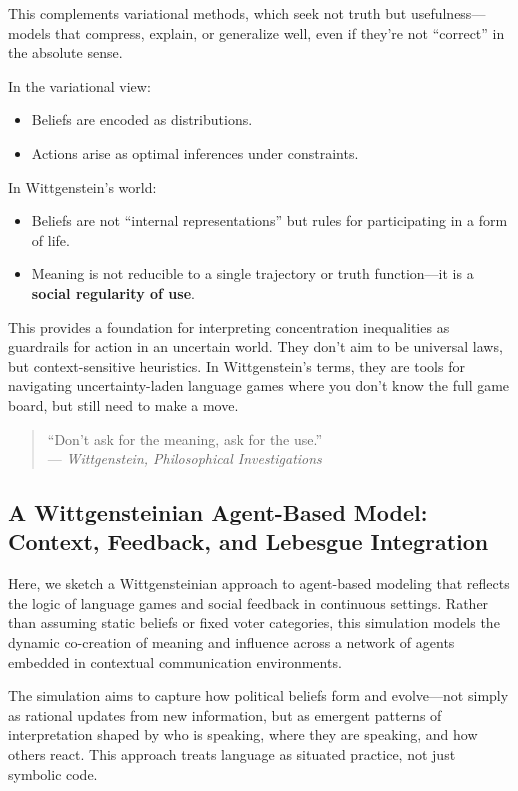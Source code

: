 This complements variational methods, which seek not truth but usefulness—models that compress, explain, or generalize well, even if they're not ``correct'' in the absolute sense.

In the variational view:
\begin{itemize}
    \item Beliefs are encoded as distributions.
    \item Actions arise as optimal inferences under constraints.
\end{itemize}

In Wittgenstein’s world:
\begin{itemize}
    \item Beliefs are not ``internal representations'' but rules for participating in a form of life.
    \item Meaning is not reducible to a single trajectory or truth function—it is a \textbf{social regularity of use}.
\end{itemize}

This provides a foundation for interpreting concentration inequalities as guardrails for action in an uncertain world. They don’t aim to be universal laws, but context-sensitive heuristics. In Wittgenstein’s terms, they are tools for navigating uncertainty-laden language games where you don’t know the full game board, but still need to make a move.

\begin{quote}
``Don’t ask for the meaning, ask for the use.'' \\
\hfill — \textit{Wittgenstein, Philosophical Investigations}
\end{quote}

\subsection{A Wittgensteinian Agent-Based Model: Context, Feedback, and Lebesgue Integration}

Here, we sketch a Wittgensteinian approach to agent-based modeling that reflects the logic of language games and social feedback in continuous settings. Rather than assuming static beliefs or fixed voter categories, this simulation models the dynamic co-creation of meaning and influence across a network of agents embedded in contextual communication environments.

The simulation aims to capture how political beliefs form and evolve—not simply as rational updates from new information, but as emergent patterns of interpretation shaped by who is speaking, where they are speaking, and how others react. This approach treats language as situated practice, not just symbolic code.

